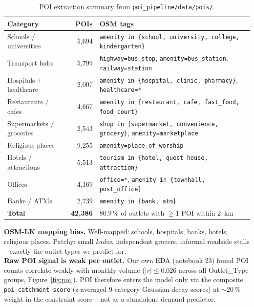 \documentclass[10pt,a4paper]{article}
\begin{document}
\begin{table}[H]
\centering
\renewcommand{\arraystretch}{1.0}
\small
\begin{tabularx}{\textwidth}{Xrl}
\toprule
\rowcolor{soft}\textbf{Category} & \textbf{POIs} & \textbf{OSM tags} \\
\midrule
Schools / universities    & 5{,}694 & \texttt{amenity in \{school, university, college, kindergarten\}} \\
Transport hubs            & 5{,}799 & \texttt{highway=bus\_stop}, \texttt{amenity=bus\_station}, \texttt{railway=station} \\
Hospitals + healthcare    & 2{,}007 & \texttt{amenity in \{hospital, clinic, pharmacy\}}, \texttt{healthcare=*} \\
Restaurants / cafes       & 4{,}667 & \texttt{amenity in \{restaurant, cafe, fast\_food, food\_court\}} \\
Supermarkets / groceries  & 2{,}543 & \texttt{shop in \{supermarket, convenience, grocery\}}, \texttt{amenity=marketplace} \\
Religious places          & 9{,}255 & \texttt{amenity=place\_of\_worship} \\
Hotels / attractions      & 5{,}513 & \texttt{tourism in \{hotel, guest\_house, attraction\}} \\
Offices                   & 4{,}169 & \texttt{office=*}, \texttt{amenity in \{townhall, post\_office\}} \\
Banks / ATMs              & 2{,}739 & \texttt{amenity in \{bank, atm\}} \\
\midrule
\textbf{Total}            & \textbf{42{,}386} & 80.9\,\% of outlets with $\geq$1 POI within 2~km \\
\bottomrule
\end{tabularx}
\caption{POI extraction summary from \texttt{poi\_pipeline/data/pois/}.}
\end{table}

\begin{caveatbox}[title=\textbf{Honest coverage + signal disclosure (cited in viva)}]
\textbf{OSM-LK mapping bias.} Well-mapped: schools, hospitals, banks, hotels,
religious places. Patchy: small \emph{kades}, independent grocers, informal
roadside stalls -- exactly the outlet types we predict for.\\[0.2em]
\textbf{Raw POI signal is weak per outlet.} Our own EDA (notebook 23) found POI
counts correlate weakly with monthly volume ($|r| \leq 0.026$ across all
Outlet\_Type groups, Figure~\ref{fig:poi}). POI therefore enters the model
only via the composite \texttt{poi\_catchment\_score} (z-averaged 9-category
Gaussian-decay scores) at ${\sim}20$\,\% weight in the constraint score --
not as a standalone demand predictor.
\end{caveatbox}
\end{document}
